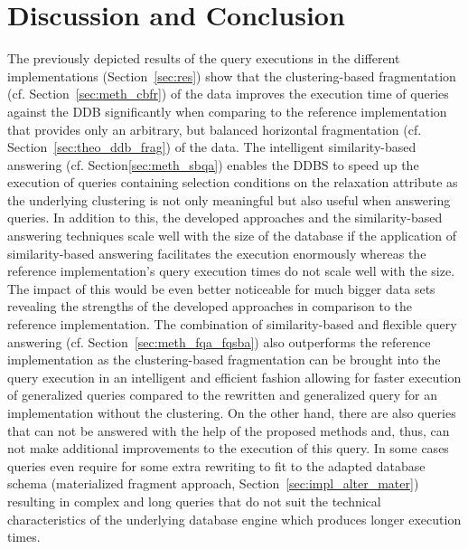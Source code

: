 
\section{Discussion and Conclusion}
\label{sec:disc}

The previously depicted results of the query executions in the different implementations (Section~\ref{sec:res}) show that the clustering-based fragmentation 
(cf. Section~\ref{sec:meth_cbfr}) of the data improves the execution time of queries against the DDB significantly when comparing to the reference implementation 
that provides only an arbitrary, but balanced horizontal fragmentation (cf. Section~\ref{sec:theo_ddb_frag}) of the data. The intelligent similarity-based answering
(cf. Section\ref{sec:meth_sbqa}) enables the DDBS to speed up the execution of queries containing selection conditions on the relaxation attribute as the underlying
clustering is not only meaningful but also useful when answering queries. In addition to this, the developed approaches and the similarity-based answering techniques
scale well with the size of the database if the application of similarity-based answering facilitates the execution enormously whereas the reference implementation's
query execution times do not scale well with the size. The impact of this would be even better noticeable for much bigger data sets revealing the strengths of the
developed approaches in comparison to the reference implementation. The combination of similarity-based and flexible query answering 
(cf. Section~\ref{sec:meth_fqa_fqsba}) also outperforms the reference implementation as the clustering-based fragmentation can be brought into the query execution 
in an intelligent and efficient fashion allowing for faster execution of generalized queries compared to the rewritten and generalized query for an implementation
without the clustering. On the other hand, there are also queries that can not be answered with the help of the proposed methods and, thus, can not make additional
improvements to the execution of this query. In some cases queries even require for some extra rewriting to fit to the adapted database schema (materialized
fragment approach, Section~\ref{sec:impl_alter_mater}) resulting in complex and long queries that do not suit the technical characteristics of the underlying 
database engine which produces longer execution times.

